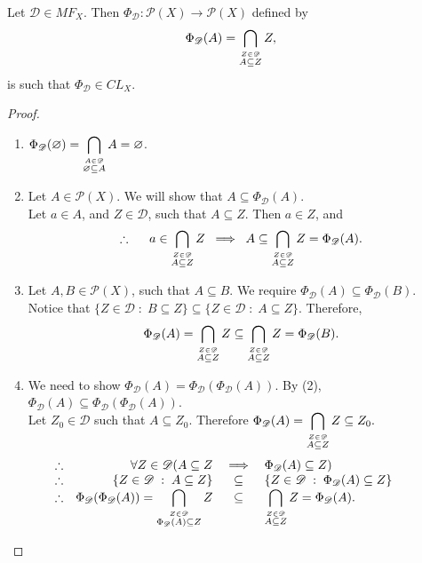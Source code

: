\documentclass{amsart}
\begin{document}
\begin{lemma}
Let \(\mathscr{D} \in MF_X\). 
Then \(\Phi _{\mathscr{D}} : \mathscr{P} (X) \longrightarrow \mathscr{P} (X)\) 
defined by
\[
\Phi _{\mathscr{D}} (A) 
= \displaystyle\bigcap_{\stackrel{Z \in \mathscr{D}}{A \subseteq Z}} Z,
\]
is such that \(\Phi _{\mathscr{D}} \in CL_X\).
\label{well_defined:lem}
\end{lemma}
\begin{proof}
\begin{enumerate}
\item
\label{empty:enu}
\(\Phi _{\mathscr{D}} (\varnothing) 
= \displaystyle\bigcap_{\stackrel{A \in \mathscr{D}}{\varnothing \subseteq A}} A 
= \varnothing\).
\item
\label{extensive:enu}
Let \(A \in \mathscr{P} (X)\). 
We will show that \(A \subseteq \Phi _{\mathscr{D}} (A)\). \\ 
Let \(a \in A\), and \(Z \in \mathscr{D}\), such that \(A \subseteq Z\).
Then \(a \in Z\), and
\[
	\therefore \hspace{5mm}
	a \in \displaystyle\bigcap_{\stackrel{Z \in \mathscr{D}}{A \subseteq Z}} Z
	\;\implies\; 
	A \subseteq \displaystyle\bigcap_{\stackrel{Z \in \mathscr{D}}{A \subseteq Z}} Z
	= \Phi _{\mathscr{D}} (A).
\]
\item
\label{monotone:enu}
Let \(A,B \in \mathscr{P} (X)\), such that \(A \subseteq B\).
We require \(\Phi _{\mathscr{D}} (A) \subseteq \Phi _{\mathscr{D}} (B)\).\\ 
Notice that
\(\{Z \in \mathscr{D} \;:\; B \subseteq Z\} 
\subseteq \{Z \in \mathscr{D} \;:\; A \subseteq Z\}\).
Therefore,
\[
	\Phi _{\mathscr{D}} (A) 
	= \displaystyle\bigcap_{\stackrel{Z \in \mathscr{D}}{A \subseteq Z}} Z 
	\subseteq \displaystyle\bigcap_{\stackrel{Z \in \mathscr{D}}{A \subseteq Z}} Z
	= \Phi _{\mathscr{D}} (B).
\]
\item
\label{idempotent:enu}
We need to show \(\Phi _{\mathscr{D}} (A) 
= \Phi _{\mathscr{D}} (\Phi _{\mathscr{D}} (A))\).
By (2), \(\Phi _{\mathscr{D}} (A) 
\subseteq \Phi _{\mathscr{D}} (\Phi _{\mathscr{D}} (A))\). \\
Let \(Z_0 \in \mathscr{D}\) such that \(A \subseteq Z_0\). 
Therefore 
\(
\Phi _{\mathscr{D}} (A) 
= \displaystyle\bigcap_{\stackrel{Z \in \mathscr{D}}{A \subseteq Z}} Z 
\subseteq Z_0.
\)
\[
\begin{array}{rrcl}
\therefore & 
\forall Z \in \mathscr{D} (A \subseteq Z 
& \implies &
\Phi _{\mathscr{D}} (A) \subseteq Z) \\ 
\therefore & 
\{Z \in \mathscr{D} \;:\; A \subseteq Z\} 
& \subseteq &
\{Z \in \mathscr{D} \;:\; \Phi _{\mathscr{D}} (A) \subseteq Z\} \\ 
\therefore & 
\Phi _{\mathscr{D}} (\Phi _{\mathscr{D}} (A)) =
\displaystyle\bigcap_{\stackrel{Z \in \mathscr{D}}{\Phi _{\mathscr{D}} (A) \subseteq Z}}Z
& \subseteq & 
\displaystyle\bigcap_{\stackrel{Z \in \mathscr{D}}{A \subseteq Z}} Z
= \Phi _{\mathscr{D}} (A).
\end{array}
\hspace{1cm}
\]
\end{enumerate}
\end{proof}
\end{document}
